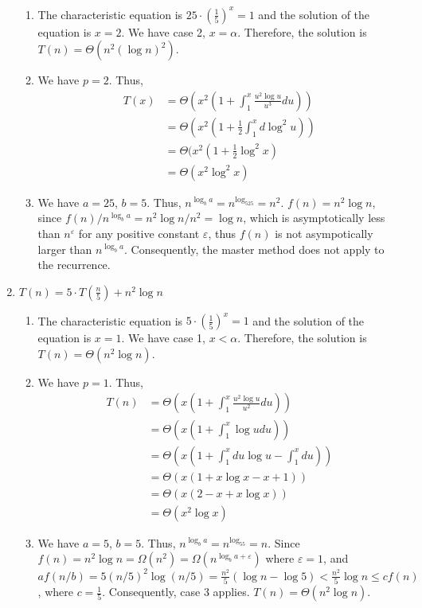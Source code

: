 \documentclass[12pt,letterpaper]{article}
\begin{document}
\begin{enumerate}[label=(\alph*)]
		\begin{enumerate}[label=\arabic*.]
			\item The characteristic equation is $25\cdot(\frac{1}{5})^x=1$ and the solution of the equation is $x=2$. We have case 2, $x=\alpha$. Therefore, the solution is $T(n)=\Theta(n^2(\log n)^2)$.
			\item We have $p=2$. Thus,
				\begin{align*}
					T(x)&=\Theta(x^2(1+\int_1^x\frac{u^2\log u}{u^3}du))\\
					&=\Theta(x^2(1+\frac{1}{2}\int_1^xd\log^2u))\\
					&=\Theta(x^2(1+\frac{1}{2}\log^2x)\\
					&=\Theta(x^2\log^2x)
				\end{align*}
			\item We have $a=25$, $b=5$. Thus, $n^{\log_ba}=n^{\log_525}=n^2$. $f(n)=n^2\log n$, since $f(n)/n^{\log_ba}=n^2\log n/n^2=\log n$, which is asymptotically less than $n^\varepsilon$ for any positive constant $\varepsilon$, thus $f(n)$ is not asympotically larger than $n^{\log_ba}$. Consequently, the master method does not apply to the recurrence.
		\end{enumerate}
	\item$T(n)=5\cdot T(\frac{n}{5})+n^2\log n$
		\begin{enumerate}[label=\arabic*.]
			\item The characteristic equation is $5\cdot(\frac{1}{5})^x=1$ and the solution of the equation is $x=1$. We have case 1, $x<\alpha$. Therefore, the solution is $T(n)=\Theta(n^2\log n)$.
			\item We have $p=1$. Thus,
				\begin{align*}
					T(n)&=\Theta(x(1+\int_1^x\frac{u^2\log u}{u^2}du))\\
					&=\Theta(x(1+\int_1^x\log udu))\\
					&=\Theta(x(1+\int_1^xdu\log u-\int_1^xdu))\\
					&=\Theta(x(1+x\log x-x+1))\\
					&=\Theta(x(2-x+x\log x))\\
					&=\Theta(x^2\log x)
				\end{align*}
			\item We have $a=5$, $b=5$. Thus, $n^{\log_ba}=n^{\log_55}=n$. Since $f(n)=n^2\log n=\Omega(n^2)=\Omega(n^{\log_ba+\varepsilon})$ where $\varepsilon=1$, and $af(n/b)=5(n/5)^2\log(n/5)=\frac{n^2}{5}(\log n-\log 5)<\frac{n^2}{5}\log n\leq cf(n)$, where $c=\frac{1}{5}$. Consequently, case 3 applies. $T(n)=\Theta(n^2\log n)$.
		\end{enumerate}
\end{enumerate}
\end{document}
